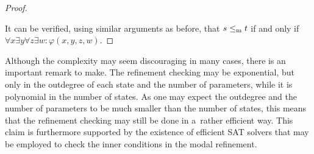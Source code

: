 \begin{proof}
\begin{enumerate}
\end{enumerate}

 It can be verified, using similar arguments as before, that 
$s \le_\mathrm m t$ if and only if \linebreak
$\forall x \exists y \forall z \exists w : \varphi(x,y,z,w)$.
\end{proof}


Although the complexity may seem discouraging in many cases, there is an 
important remark to make. The refinement checking may be exponential,
but only in the outdegree of each state and the number of
parameters, while it is polynomial in the number of states. 
As one may expect the outdegree and the number of parameters to be much smaller
than the number of states, this means that the refinement checking
may still be done in a~rather efficient way. This claim is furthermore
supported by the existence of efficient SAT solvers that may be employed 
to check the inner conditions in the modal refinement.




